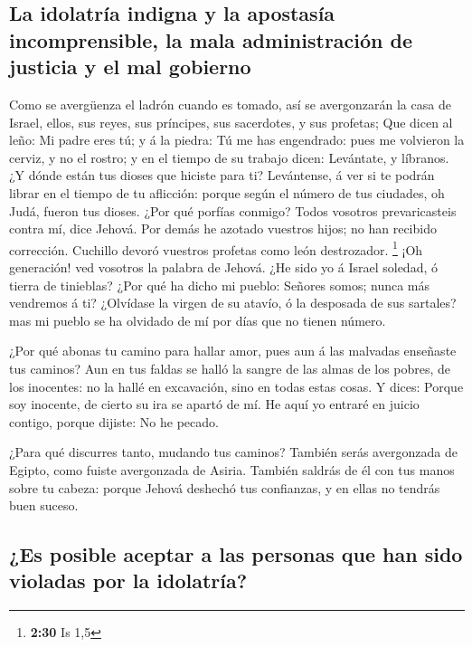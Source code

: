 \hypertarget{la-idolatruxeda-indigna-y-la-apostasuxeda-incomprensible-la-mala-administraciuxf3n-de-justicia-y-el-mal-gobierno}{%
\subsection{La idolatría indigna y la apostasía incomprensible, la mala
administración de justicia y el mal
gobierno}\label{la-idolatruxeda-indigna-y-la-apostasuxeda-incomprensible-la-mala-administraciuxf3n-de-justicia-y-el-mal-gobierno}}

 Como se avergüenza el ladrón cuando es tomado, así se
avergonzarán la casa de Israel, ellos, sus reyes, sus príncipes, sus
sacerdotes, y sus profetas;  Que dicen al leño: Mi padre
eres tú; y á la piedra: Tú me has engendrado: pues me volvieron la
cerviz, y no el rostro; y en el tiempo de su trabajo dicen: Levántate, y
líbranos.  ¿Y dónde están tus dioses que hiciste para ti?
Levántense, á ver si te podrán librar en el tiempo de tu aflicción:
porque según el número de tus ciudades, oh Judá, fueron tus dioses.
 ¿Por qué porfías conmigo? Todos vosotros prevaricasteis
contra mí, dice Jehová.  Por demás he azotado vuestros
hijos; no han recibido corrección. Cuchillo devoró vuestros profetas
como león destrozador. \footnote{\textbf{2:30} Is 1,5} 
¡Oh generación! ved vosotros la palabra de Jehová. ¿He sido yo á Israel
soledad, ó tierra de tinieblas? ¿Por qué ha dicho mi pueblo: Señores
somos; nunca más vendremos á ti?  ¿Olvídase la virgen de
su atavío, ó la desposada de sus sartales? mas mi pueblo se ha olvidado
de mí por días que no tienen número.

 ¿Por qué abonas tu camino para hallar amor, pues aun á
las malvadas enseñaste tus caminos?  Aun en tus faldas se
halló la sangre de las almas de los pobres, de los inocentes: no la
hallé en excavación, sino en todas estas cosas.  Y dices:
Porque soy inocente, de cierto su ira se apartó de mí. He aquí yo
entraré en juicio contigo, porque dijiste: No he pecado.

 ¿Para qué discurres tanto, mudando tus caminos? También
serás avergonzada de Egipto, como fuiste avergonzada de Asiria.
 También saldrás de él con tus manos sobre tu cabeza:
porque Jehová deshechó tus confianzas, y en ellas no tendrás buen
suceso.

\hypertarget{es-posible-aceptar-a-las-personas-que-han-sido-violadas-por-la-idolatruxeda}{%
\subsection{¿Es posible aceptar a las personas que han sido violadas por
la
idolatría?}\label{es-posible-aceptar-a-las-personas-que-han-sido-violadas-por-la-idolatruxeda}}

